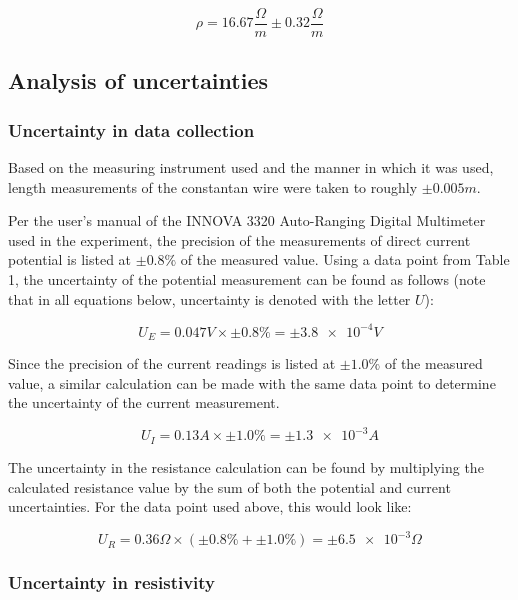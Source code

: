 \documentclass{article}
\begin{document}
\begin{equation}
    \rho = 16.67\frac{\Omega}{m} \pm 0.32\frac{\Omega}{m}
\end{equation}

\subsection{Analysis of uncertainties}

\subsubsection{Uncertainty in data collection}

Based on the measuring instrument used and the manner in which it was used, length measurements of the constantan wire were taken to roughly $\pm0.005m$. 

Per the user's manual \cite{man} of the INNOVA 3320 Auto-Ranging Digital Multimeter used in the experiment, the precision of the measurements of direct current potential is listed at $\pm0.8\%$ of the measured value. Using a data point from Table 1, the uncertainty of the potential measurement can be found as follows (note that in all equations below, uncertainty is denoted with the letter $U$):

\begin{equation}
    U_E = 0.047V \times \pm0.8\% = \pm\num{3.8e-4}V
\end{equation}

Since the precision of the current readings is listed at $\pm1.0\%$ of the measured value, a similar calculation can be made with the same data point to determine the uncertainty of the current measurement.

\begin{equation}
    U_I = 0.13A \times \pm1.0\% = \pm\num{1.3e-3}A
\end{equation}

The uncertainty in the resistance calculation can be found by multiplying the calculated resistance value by the sum of both the potential and current uncertainties. For the data point used above, this would look like:

\begin{equation}
    U_R = 0.36\Omega \times (\pm0.8\% + \pm1.0\%) = \pm\num{6.5e-3}\Omega
\end{equation}

\subsubsection{Uncertainty in resistivity}
\label{sec:res}
\end{document}
